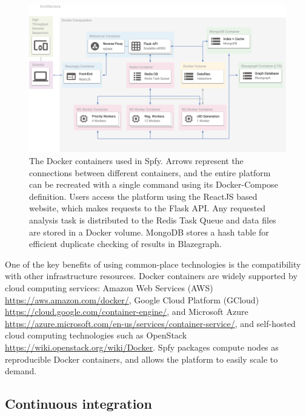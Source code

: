 \documentclass{article}
\begin{document}
\begin{figure}[!hb]
\begin{center}
\includegraphics[width=\textwidth]{images/docker}
\end{center}
\caption{The Docker containers used in Spfy. Arrows represent the connections between different containers, and the entire platform can be recreated with a single command using its Docker-Compose definition. Users access the platform using the ReactJS based website, which makes requests to the Flask API. Any requested analysis task is distributed to the Redis Task Queue and data files are stored in a Docker volume. MongoDB stores a hash table for efficient duplicate checking of results in Blazegraph.}
\label{fig-docker}
\end{figure}

One of the key benefits of using common-place technologies is the compatibility with other infrastructure resources.
Docker containers are widely supported by cloud computing services: Amazon Web Services (AWS) \url{https://aws.amazon.com/docker/}, Google Cloud Platform (GCloud) \url{https://cloud.google.com/container-engine/}, and Microsoft Azure \url{https://azure.microsoft.com/en-us/services/container-service/}, and self-hosted cloud computing technologies such as OpenStack \url{https://wiki.openstack.org/wiki/Docker}.
Spfy packages compute nodes as reproducible Docker containers, and allows the platform to easily scale to demand.

\subsection{Continuous integration}
\end{document}
